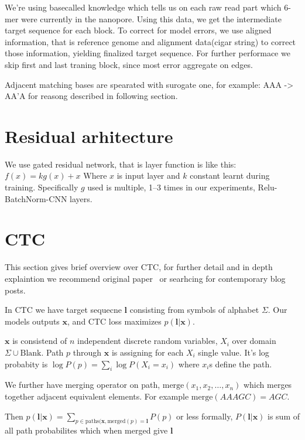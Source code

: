 \documentclass[times, utf8, seminar, numeric]{fer}
\begin{document}
We're using basecalled knowledge which tells us on each raw read part which 6-mer were currently in the nanopore. Using this data, we get the intermediate target sequence for each block. To correct for model errors, we use aligned information, that is reference genome and alignment data(cigar string) to correct those information, yielding finalized target sequence. For further performace we skip first and last traning block, since most error aggregate on edges.

Adjacent matching bases are spearated with surogate one, for example: AAA -> AA'A for reasong described in following section.
\section{Residual arhitecture}

We use gated residual network, that is layer function is like this: $f(x) = k g(x) + x$ Where $x$ is input layer and $k$ constant learnt during training. Specifically $g$ used is multiple, 1--3 times in our experiments, Relu-BatchNorm-CNN layers.

\section{CTC}

This section gives brief overview over CTC, for further detail and in depth explaintion we recommend original paper~\cite{graves2006connectionist} or searhcing for contemporary blog posts.

In CTC we have target sequecne $\mathbf{l}$ consisting from symbols of alphabet $\Sigma$. Our models outputs $\mathbf{x}$, and CTC loss maximizes $p(\mathbf{l}|\mathbf{x})$.

$\mathbf{x}$ is consistend of $n$ independent discrete random variables, $X_i$  over domain $\Sigma \cup \text{Blank}$. Path $p$ through $\mathbf{x}$ is assigning for each $X_i$ single value. It's log probabity is $\log P(p) = \sum_i {\log P(X_i=x_i)}$ where $x_i$s define the path.

We further have merging operator on path, $\text{merge}(x_1, x_2, \ldots, x_n)$ which merges together adjacent equivalent elements. For example $\text{merge}(AAAGC) = AGC$.

Then $p(\mathbf{l}|\mathbf{x}) = \sum_{p\in\text{paths}(\mathbf{x}, \text{merged}(p) = \mathbf{l}}{P(p)}$ or less formally, $P(\mathbf{l}|\mathbf{x})$ is sum of all path probabilites which when merged give $\mathbf{l}$
\end{document}
